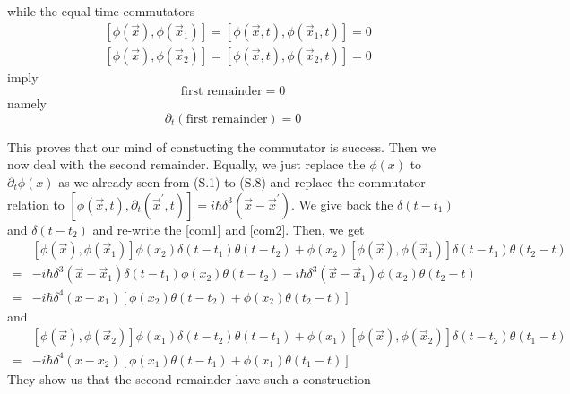 \documentclass[12pt,openany]{book}
\begin{document}
	while the equal-time commutators
	\begin{equation}\label{eqtime}
	\begin{aligned}
		&\left[\phi(\vec{x}),\phi(\vec{x}_1)\right]=\left[\phi(\vec{x},t),\phi(\vec{x}_1,t)\right]=0\\
		&\left[\phi(\vec{x}),\phi(\vec{x}_2)\right]=\left[\phi(\vec{x},t),\phi(\vec{x}_2,t)\right]=0
	\end{aligned}
	\end{equation}
	imply 
	\begin{equation}
		\text{first remainder}=0
	\end{equation}
	namely
	\begin{equation}
		\partial_t(\text{first remainder})=0
	\end{equation}
	\par 
	This proves that our mind of constucting the commutator is success. Then we now deal with the 
	second remainder. Equally, we just replace the $\phi(x)$ to $\partial_t\phi(x)$ as we already seen from (S.1) to (S.8) and replace the 
	commutator relation to $[\phi(\vec{x},t),\partial_t(\vec{x}^\prime,t)]=i\hbar\delta^3(\vec{x}-\vec{x}^\prime)$. We give back the $\delta(t-t_1)$ and $\delta(t-t_2)$ and re-write 
	the \eqref{com1} and \eqref{com2}. Then, we get
	\begin{equation}
		\begin{aligned}
	   &\left[\phi(\vec{x}),\phi(\vec{x}_1)\right]\phi(x_2)\delta(t-t_1)\theta(t-t_2)+\phi(x_2)\left[\phi(\vec{x}),\phi(\vec{x}_1)\right]\delta(t-t_1)\theta(t_2-t)\\
	  =&-i\hbar\delta^3(\vec{x}-\vec{x}_1)\delta(t-t_1)\phi(x_2)\theta(t-t_2)-i\hbar\delta^3(\vec{x}-\vec{x}_1)\phi(x_2)\theta(t_2-t)\\
	  =&-i\hbar\delta^4(x-x_1)\left[\phi(x_2)\theta(t-t_2)+\phi(x_2)\theta(t_2-t)\right]
		\end{aligned}
	\end{equation}
	and 
	\begin{equation}
		\begin{aligned}
			&\left[\phi(\vec{x}),\phi(\vec{x}_2)\right]\phi(x_1)\delta(t-t_2)\theta(t-t_1)+\phi(x_1)\left[\phi(\vec{x}),\phi(\vec{x}_2)\right]\delta(t-t_2)\theta(t_1-t)\\
		   =&-i\hbar\delta^4(x-x_2)\left[\phi(x_1)\theta(t-t_1)+\phi(x_1)\theta(t_1-t)\right]
		\end{aligned}
	\end{equation}
	They show us that the second remainder have such a construction
\end{document}
